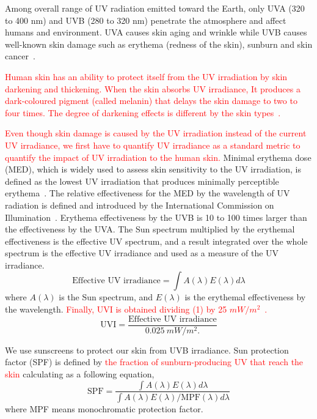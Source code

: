 \documentclass[journal]{IEEEtran}
\begin{document}
Among overall range of UV radiation emitted toward the Earth, only UVA (320 to 400 nm) and UVB (280 to 320 nm) penetrate the atmosphere and affect humans and environment. UVA causes skin aging and wrinkle while UVB causes well-known skin damage such as erythema (redness of the skin), sunburn and skin cancer~\cite{Matsumura:TAP04}.

\textcolor{red}{Human skin has an ability to protect itself from the UV irradiation by skin darkening and thickening. When the skin absorbs UV irradiance, It produces a dark-coloured pigment (called melanin) that delays the skin damage to two to four times. The degree of darkening effects is different by the skin types~\cite{Harrison:Method02}.}

\textcolor{red}{Even though skin damage is caused by the UV irradiation instead of the current UV irradiance, we first have to quantify UV irradiance as  a standard metric to quantify the impact of UV irradiation to the human skin.}
Minimal erythema dose (MED), which is widely used to assess skin sensitivity to the UV irradiation, is defined as the lowest UV irradiation that produces minimally perceptible erythema~\cite{Diffey:CPPM91}. The relative effectiveness for the MED by the wavelength of UV radiation is defined and introduced by the International Commission on Illumination~\cite{CIE}. Erythema effectiveness by the UVB is 10 to 100 times larger than the effectiveness by the UVA. The Sun spectrum multiplied by the erythemal effectiveness is the effective UV spectrum, and a result integrated over the whole spectrum is the effective UV irradiance and used as a measure of the UV irradiance.
\begin{equation}
\text{Effective~UV~irradiance} = \int A(\lambda)E(\lambda) d \lambda
 \end{equation}
where $A(\lambda)$ is the Sun spectrum, and $E(\lambda)$ is the erythemal effectiveness by the wavelength. \textcolor{red}{Finally, UVI is obtained dividing (1) by 25 $mW/m^2$~\cite{CIE}.}
\begin{equation}
\text{UVI}= \frac{\text{Effective~UV~irradiance}}{0.025~mW/m^2.}
 \end{equation}

We use sunscreens to protect our skin from UVB irradiance. Sun protection factor (SPF) is defined by \textcolor{red}{the fraction of sunburn-producing UV that reach the skin} calculating as a following equation,
\begin{equation}
\text{SPF} = \frac{\int A(\lambda)E(\lambda) d \lambda}{\int A(\lambda)E(\lambda) / \text{MPF}(\lambda) d \lambda}
 \end{equation}
where MPF means monochromatic protection factor.
\end{document}
